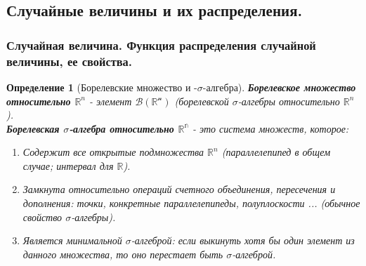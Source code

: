 \documentclass[14pt]{extarticle}
\theoremstyle{breakstyle}
\newtheorem{definition}{Определение}[subsection]
\begin{document}
\subsection{Случайные величины и их распределения.}

\subsubsection{Случайная величина. Функция распределения случайной величины, ее свойства.}
\begin{definition}[Борелевские множество и -$\sigma$-алгебра]

\textbf{Борелевское множество относительно $\mathbb{R}^{n}$} - элемент $\mathscr{B(\mathbb{R}^{n})}$ (борелевской $\sigma$-алгебры относительно $\mathbb{R}^{n}$).\\

\textbf{Борелевская $\sigma$-алгебра относительно $\mathbb{R^{n}}$} - это система множеств, которое:
\begin{enumerate}
    \item Содержит все открытые подмножества $\mathbb{R}^{n}$ (параллелепипед в общем случае; интервал для $\mathbb{R}$).
    \item Замкнута относительно операций счетного объединения, пересечения и дополнения: точки, конкретные параллелепипеды, полуплоскости ... (обычное свойство $\sigma$-алгебры). 
    \item Является минимальной $\sigma$-алгеброй: если выкинуть хотя бы один элемент из данного множества, то оно перестает быть $\sigma$-алгеброй.
\end{enumerate}

\end{definition}
\end{document}
